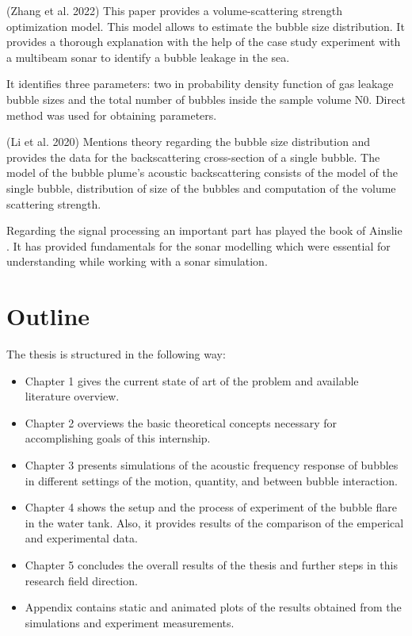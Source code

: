 (Zhang et al. 2022\cite{zhang_efficient_2022}) This paper provides a volume-scattering strength optimization model. This model allows to estimate the bubble size distribution. It provides a thorough explanation with the help of the case study experiment with a multibeam sonar to identify a bubble leakage in the sea.

It identifies three parameters: two in probability density function of gas leakage bubble sizes and the total number of bubbles inside the sample volume N0. Direct method was used for obtaining parameters.

(Li et al. 2020\cite{li_broadband_2020}) Mentions theory regarding the bubble size distribution and provides the data for the backscattering cross-section of a single bubble. The model of the bubble plume’s acoustic backscattering consists of the model of the single bubble, distribution of size of the bubbles and computation of the volume scattering strength.

Regarding the signal processing an important part has played the book of Ainslie \cite[]{ainslie_principles_2010}. It has provided fundamentals for the sonar modelling which were essential for understanding while working with a sonar simulation. 

\section{Outline}
The thesis is structured in the following way:
\begin{itemize}
    \item Chapter 1 gives the current state of art of the problem and available literature overview.
    \item Chapter 2 overviews the basic theoretical concepts necessary for accomplishing goals of this internship.
    \item Chapter 3 presents simulations of the acoustic frequency response of bubbles in different settings of the motion, quantity, and between bubble interaction. 
    \item Chapter 4 shows the setup and the process of experiment of the bubble flare in the water tank. Also, it provides results of the comparison of the emperical and experimental data.
    \item Chapter 5 concludes the overall results of the thesis and further steps in this research field direction.
    \item Appendix contains static and animated plots of the results obtained from the simulations and experiment measurements.  
\end{itemize}